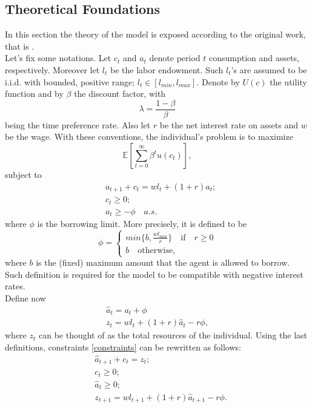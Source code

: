 \documentclass[12pt]{article}
\begin{document}
\subsection{Theoretical Foundations}
In this section the theory of the model is exposed according to the original work, that is \cite{aiya94}. \\
Let's fix some notations. Let $c_t$ and $a_t$ denote period $t$ consumption and assets, respectively. Moreover let $l_t$ be the labor endowment. Such $l_t$'s are assumed to be i.i.d. with bounded, positive range; $l_t \in \left[l_{min}, l_{max} \right]$. Denote by $U(c)$ the utility function and  by $\beta$ the discount factor, with
\begin{equation}
\lambda = \frac{1 - \beta}{\beta}
\end{equation}
being the time preference rate. Also let $r$ be the net interest rate on assets and $w$ be the wage. With these conventions, the individual's problem is to maximize
\begin{equation}
\label{problem}
\mathbb E \left[ \sum_{t=0}^{\infty} \beta^t u(c_t) \right],
\end{equation}
subject to 
\begin{align}
\label{constraints}
&a_{t+1} + c_t = wl_t + (1+r)a_t; \nonumber \\
&c_t \geq 0; \nonumber \\
&a_t \geq -\phi \quad a.s .
\end{align}
where $\phi$ is the borrowing limit. More precisely, it is defined to be
\begin{equation}
\phi = \begin{cases}
		min\{b, \frac{wl_{min}}{r} \} \quad \text{if} \quad r \geq 0 \\
		b \quad \text{otherwise,}
		\end{cases}
\end{equation}
where $b$ is the (fixed) maximum amount that the agent is allowed to borrow. Such definition is required for the model to be compatible with negative interest rates. \\
Define now
\begin{align}
\label{hata}
\hat{a}_t = a_t + \phi \\
z_t = wl_t + (1 + r)\hat{a}_t -r\phi,
\end{align}
where $z_t$ can be thought of as the total resources of the individual. Using the last definitions, constraints \ref{constraints} can be rewritten as follows:
\begin{align}
\label{newconstraint}
&\hat{a}_{t+1} + c_t = z_t;  \\
&c_t \geq 0; \nonumber \\
&\hat{a}_t \geq 0; \nonumber \\
&z_{t+1} = wl_{t+1} + (1 + r)\hat{a}_{t+1} - r\phi.
\end{align}
\end{document}
